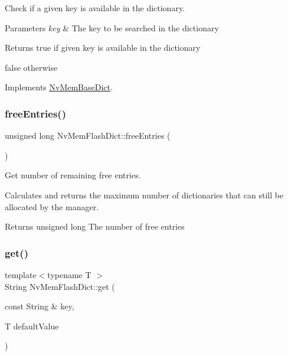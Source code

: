 Check if a given {\ttfamily key} is available in the dictionary. 


\begin{DoxyParams}{Parameters}
{\em key} & The key to be searched in the dictionary \\
\hline
\end{DoxyParams}
\begin{DoxyReturn}{Returns}
true if given key is available in the dictionary 

false otherwise 
\end{DoxyReturn}


Implements \mbox{\hyperlink{class_nv_mem_base_dict_a755616173e4c94cf2a3cd227c38660d1}{Nv\+Mem\+Base\+Dict}}.

\mbox{\label{class_nv_mem_flash_dict_a1db17ef21b447a6e644389cc5b44f122}} 
\subsubsection{\texorpdfstring{freeEntries()}{freeEntries()}}
{\footnotesize\ttfamily unsigned long Nv\+Mem\+Flash\+Dict\+::free\+Entries (\begin{DoxyParamCaption}{ }\end{DoxyParamCaption})}



Get number of remaining free entries. 

Calculates and returns the maximum number of dictionaries that can still be allocated by the manager.

\begin{DoxyReturn}{Returns}
unsigned long The number of free entries 
\end{DoxyReturn}
\mbox{\label{class_nv_mem_flash_dict_a49632ee590fb5cf5b27bd6442c016e6f}} 
\subsubsection{\texorpdfstring{get()}{get()}\hspace{0.1cm}{\footnotesize\ttfamily [1/2]}}
{\footnotesize\ttfamily template$<$typename T $>$ \\
String Nv\+Mem\+Flash\+Dict\+::get (\begin{DoxyParamCaption}\item[{const String \&}]{key,  }\item[{T}]{default\+Value }\end{DoxyParamCaption})}



